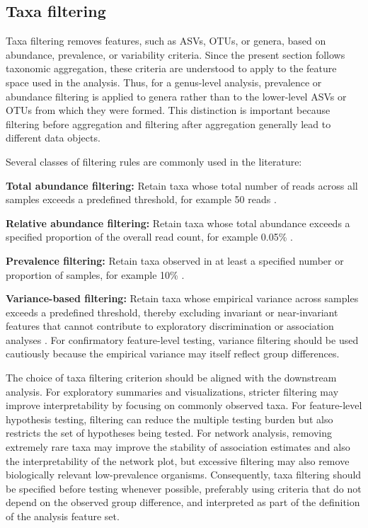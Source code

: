 \subsection{Taxa filtering}
\label{sec:2micro:filtering:taxa}

Taxa filtering removes features, such as ASVs, OTUs, or genera, based on abundance, prevalence, or variability criteria. 
Since the present section follows taxonomic aggregation, these criteria are understood to apply to the feature space used in the analysis. Thus, for a genus-level analysis, prevalence or abundance filtering is applied to genera rather than to the lower-level ASVs or OTUs from which they were formed. This distinction is important because filtering before aggregation and filtering after aggregation generally lead to different data objects.

Several classes of filtering rules are commonly used in the literature:

\noindent\textbf{Total abundance filtering:} Retain taxa whose total number of reads across all samples exceeds a predefined threshold, for example 50 reads \citep{kirjavainen2019farmlike,roggenbuck2014microbiome}.

\noindent\textbf{Relative abundance filtering:} Retain taxa whose total abundance exceeds a specified proportion of the overall read count, for example 0.05\% \citep{bokulich2013qualityfiltering}.

\noindent\textbf{Prevalence filtering:} Retain taxa observed in at least a specified number or proportion of samples, for example 10\% \citep{carcy2024metaibs}.

\noindent\textbf{Variance-based filtering:} Retain taxa whose empirical variance across samples exceeds a predefined threshold, thereby excluding invariant or near-invariant features that cannot contribute to exploratory discrimination or association analyses \citep{borman2024orchestrating}. For confirmatory feature-level testing, variance filtering should be used cautiously because the empirical variance may itself reflect group differences.

The choice of taxa filtering criterion should be aligned with the downstream analysis. For exploratory summaries and visualizations, stricter filtering may improve interpretability by focusing on commonly observed taxa. For feature-level hypothesis testing, filtering can reduce the multiple testing burden but also restricts the set of hypotheses being tested. For network analysis, removing extremely rare taxa may improve the stability of association estimates and also the interpretability of the network plot, but excessive filtering may also remove biologically relevant low-prevalence organisms. Consequently, taxa filtering should be specified before testing whenever possible, preferably using criteria that do not depend on the observed group difference, and interpreted as part of the definition of the analysis feature set.

